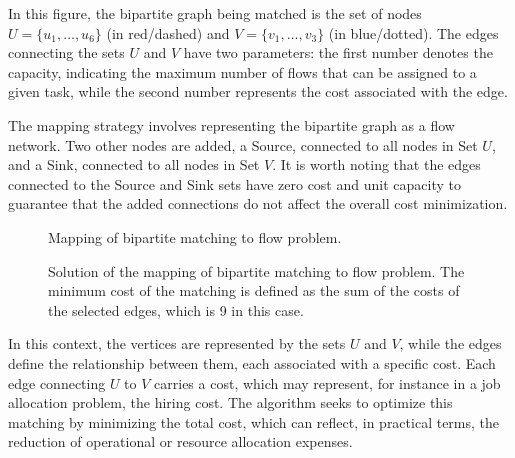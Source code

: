             In this figure, the bipartite graph being matched is the set of nodes $U = \{u_1, \ldots, u_6\}$ (in red/dashed) and $V = \{v_1, \ldots, v_3\}$ (in blue/dotted). 
            The edges connecting the sets $U$ and $V$ have two parameters: the first number denotes the capacity, indicating the maximum number of flows that can be assigned to a given task, while the second number represents the cost associated with the edge. 
            
            The mapping strategy involves representing the bipartite graph as a flow network. 
            Two other nodes are added, a Source, connected to all nodes in Set $U$, and a Sink, connected to all nodes in Set $V$. 
            It is worth noting that the edges connected to the Source and Sink sets have zero cost and unit capacity to guarantee that the added connections do not affect the overall cost minimization.
            
            \begin{figure}[ht] \centering
                
                \caption{Mapping of bipartite matching to flow problem.}
                \label{fig:mcmf} 
            \end{figure}
            
            \begin{figure}[ht] \centering 
                
                \caption{Solution of the mapping of bipartite matching to flow problem. The minimum cost of the matching is defined as the sum of the costs of the selected edges, which is 9 in this case.}
                \label{fig:solucao_mcmf}
            \end{figure}
            
            In this context, the vertices are represented by the sets $U$ and $V$, while the edges define the relationship between them, each associated with a specific cost. 
            Each edge connecting $U$ to $V$ carries a cost, which may represent, for instance in a job allocation problem, the hiring cost. 
            The algorithm seeks to optimize this matching by minimizing the total cost, which can reflect, in practical terms, the reduction of operational or resource allocation expenses.
            
